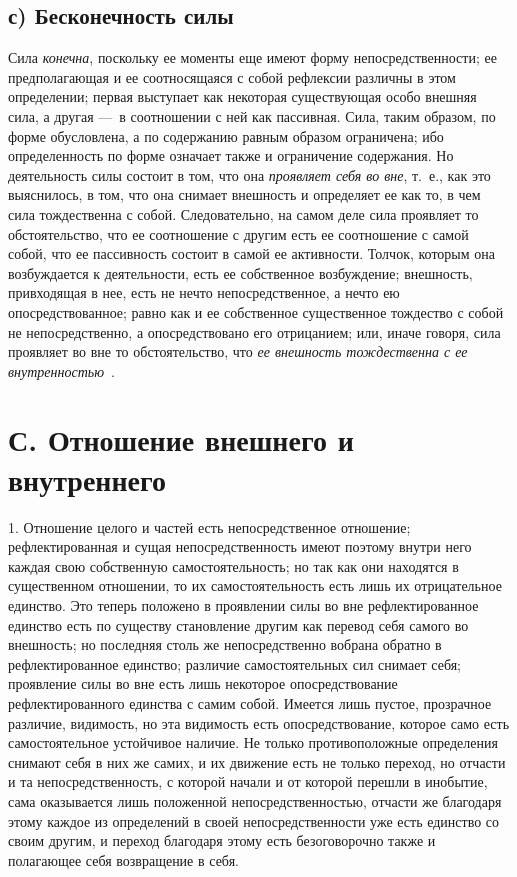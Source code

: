 \subsection[с) Бесконечность силы]{с) Бесконечность силы}

Сила {\em конечна},
поскольку ее моменты еще имеют форму непосредственности; ее предполагающая
и ее соотносящаяся с собой рефлексии различны в этом определении; первая
выступает как некоторая существующая особо внешняя сила, а другая —~в
соотношении с ней как пассивная. Сила, таким образом, по форме обусловлена,
а по содержанию равным образом ограничена; ибо определенность по форме
означает также и ограничение содержания. Но деятельность силы состоит в
том, что она {\em проявляет себя во вне}, т.~е., как
это выяснилось, в том, что она снимает внешность и определяет ее как то, в
чем сила тождественна с собой. Следовательно, на самом деле сила проявляет
то обстоятельство, что ее соотношение с другим есть ее соотношение с самой
собой, что ее пассивность состоит в самой ее активности. Толчок, которым
она возбуждается к деятельности, есть ее собственное возбуждение;
внешность, привходящая в нее, есть не нечто непосредственное, а нечто ею
опосредствованное; равно как и ее собственное существенное тождество с
собой не непосредственно, а опосредствовано его отрицанием; или, иначе
говоря, сила проявляет во вне то обстоятельство, что
{\em ее внешность тождественна с ее
внутренностью}~.


\section[С. Отношение внешнего и внутреннего]
{С. Отношение внешнего и внутреннего}

1. Отношение целого и частей есть
непосредственное отношение; рефлектированная и сущая непосредственность
имеют поэтому внутри него каждая свою собственную самостоятельность; но так
как они находятся в существенном отношении, то их самостоятельность есть
лишь их отрицательное единство. Это теперь положено в проявлении силы во
вне рефлектированное единство есть по существу становление другим как
перевод себя самого во внешность; но последняя столь же непосредственно
вобрана обратно в рефлектированное единство; различие самостоятельных сил
снимает себя; проявление силы во вне есть лишь некоторое опосредствование
рефлектированного единства с самим собой. Имеется лишь пустое, прозрачное
различие, видимость, но эта видимость есть опосредствование, которое само
есть самостоятельное устойчивое наличие. Не только противоположные
определения снимают себя в них же самих, и их движение есть не только
переход, но отчасти и та непосредственность, с которой начали и от которой
перешли в инобытие, сама оказывается лишь положенной непосредственностью,
отчасти же благодаря этому каждое из определений в своей непосредственности
уже есть единство со своим другим, и переход благодаря этому есть
безоговорочно также и полагающее себя возвращение в себя.

